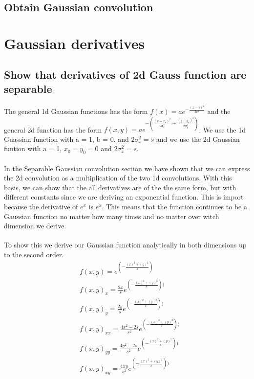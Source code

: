 \documentclass[abstract=true]{scrartcl}
\begin{document}
    \subsection{Obtain Gaussian convolution}


\section{Gaussian derivatives}

    \subsection{Show that derivatives of 2d Gauss function are separable}
    
    The general 1d Gaussian functions has the form 
    $ f(x) = a e^{- { \frac{(x-b)^2 }{ 2 c^2} } } $ 
    and the general 2d function has the form 
    $ f(x,y) = a e^{- \left(\frac{(x-x_o)^2}{2\sigma_x^2} + \frac{(y-y_o)^2}{2\sigma_y^2} \right)} $. 
    We use the 1d Guassian function with a = 1, b = 0, and $ 2\sigma_x^2 = s $ and
    we use the 2d Gaussian funtion with a = 1, $ x_0 = y_0 = 0 $ and $ 2\sigma_x^2 = s $.\\
    \\
    In the Separable Gaussian convolution section we have shown that we can express the
    2d convolution as a multiplication of the two 1d convolutions. With this 
    basis, we can show that the all derivatives are of the the 
    same form, but with different constants since we are deriving an exponential
    function. This is import because the derivative of $e^x$ is $e^x$. This 
    means that the function continues to be a Gaussian function no matter how
    many times and no matter over witch dimension we derive. \\
    \\
    To show this we derive our Gaussian function analytically in both dimensions 
    up to the second order.\\
    \begin{align*}
    &f(x,y)   =  e^{ (-\frac{(x)^2 +(y)^2}{s})} \\
    &f(x,y)_x =  \frac{2x}{s} e^{ (-\frac{(x)^2 +(y)^2}{s}))} \\
    &f(x,y)_y = \frac{2y}{s} e^{ ( -\frac{(x)^2 +(y)^2}{s}))} \\
    &f(x,y)_{xx} =  \frac{4x^2-2s}{s^2} e^{ (-\frac{(x)^2 +(y)^2}{s}))} \\
    &f(x,y)_{yy} =  \frac{4y^2-2s}{s^2} e^{ (-\frac{(x)^2 +(y)^2}{s}))} \\
    &f(x,y)_{xy} =  \frac{4xy}{s^2} e^{ (-\frac{(x)^2 +(y)^2}{s}))}
    \end{align*}
    
\end{document}
